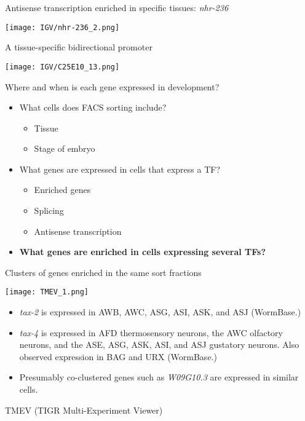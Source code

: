 \documentclass[serif,9pt]{beamer}
\begin{document}
\begin{frame}{Antisense transcription enriched in specific tissues: {\em nhr-236}}

\texttt{[image: IGV/nhr-236\_2.png]}

\end{frame}

\begin{frame}{A tissue-specific bidirectional promoter}

\texttt{[image: IGV/C25E10\_13.png]}

\end{frame}


\begin{frame}{Where and when is each gene expressed in development?}
\begin{itemize}
\item What cells does FACS sorting include?
\begin{itemize}
\item Tissue
\item Stage of embryo
\end{itemize}
\item What genes are expressed in cells that express a TF?
\begin{itemize}
\item Enriched genes
\item Splicing
\item Antisense transcription
\end{itemize}
\item {\bf What genes are enriched in cells expressing several TFs?}
\end{itemize}
\end{frame}

\begin{frame}{Clusters of genes enriched in the same sort fractions}
\begin{minipage}{0.5\textwidth}
\texttt{[image: TMEV\_1.png]}
\end{minipage}
\begin{minipage}{0.48\textwidth}
{\small 
\begin{itemize}

\item {\em tax-2} is expressed in AWB, AWC, ASG, ASI, ASK, and ASJ (WormBase.)

\item {\em tax-4} is expressed in AFD thermosensory neurons, the AWC olfactory neurons, and the ASE, ASG, ASK, ASI, and ASJ gustatory neurons. Also observed expression in BAG and URX (WormBase.)

\item Presumably co-clustered genes such as {\em W09G10.3} are expressed
in similar cells.

\end{itemize}
}
\end{minipage}
\vspace{5mm}

\hfill TMEV (TIGR Multi-Experiment Viewer)
\end{frame}
\end{document}

